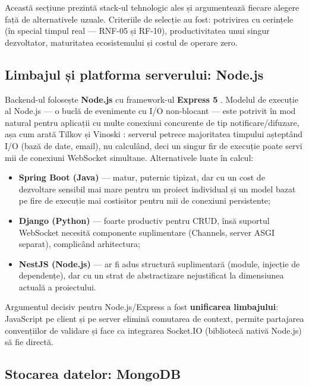 Această secțiune prezintă stack-ul tehnologic ales și argumentează fiecare alegere față de alternativele uzuale. Criteriile de selecție au fost: potrivirea cu cerințele (în special timpul real --- RNF-05 și RF-10), productivitatea unui singur dezvoltator, maturitatea ecosistemului și costul de operare zero.

\subsection{Limbajul și platforma serverului: Node.js}

Backend-ul folosește \textbf{Node.js} cu framework-ul \textbf{Express 5} \cite{expressdocs}. Modelul de execuție al Node.js --- o buclă de evenimente cu I/O non-blocant --- este potrivit în mod natural pentru aplicații cu multe conexiuni concurente de tip notificare/difuzare, așa cum arată Tilkov și Vinoski \cite{tilkov2010}: serverul petrece majoritatea timpului așteptând I/O (bază de date, email), nu calculând, deci un singur fir de execuție poate servi mii de conexiuni WebSocket simultane. Alternativele luate în calcul:

\begin{itemize}
    \item \textbf{Spring Boot (Java)} --- matur, puternic tipizat, dar cu un cost de dezvoltare sensibil mai mare pentru un proiect individual și un model bazat pe fire de execuție mai costisitor pentru mii de conexiuni persistente;
    \item \textbf{Django (Python)} --- foarte productiv pentru CRUD, însă suportul WebSocket necesită componente suplimentare (Channels, server ASGI separat), complicând arhitectura;
    \item \textbf{NestJS (Node.js)} --- ar fi adus structură suplimentară (module, injecție de dependențe), dar cu un strat de abstractizare nejustificat la dimensiunea actuală a proiectului.
\end{itemize}

Argumentul decisiv pentru Node.js/Express a fost \textbf{unificarea limbajului}: JavaScript pe client și pe server elimină comutarea de context, permite partajarea convențiilor de validare și face ca integrarea Socket.IO (bibliotecă nativă Node.js) să fie directă.

\subsection{Stocarea datelor: MongoDB}

